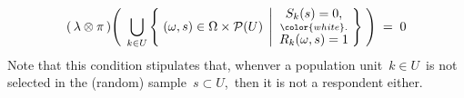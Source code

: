 \begin{itemize}
    \begin{equation*}
    (\,\lambda\otimes\pi\,)\!\left(\;\,
        \underset{k \in U}{\bigcup}\left\{\;
            (\omega,s) \in \Omega\times\mathcal{P}(U)
            \;\left\vert
            \begin{array}{c}
            S_{k}(s) = 0, %
            \\
            \overset{{\color{white}.}}{R_{k}(\omega,s) = 1}
            \end{array}
            \right.
            \!\!\right\}
        \;\right)
    \; = \;
        0
    \end{equation*}
    Note that this condition stipulates that,
    whenver a population unit \,$k \in U$\, is not selected in the (random) sample \,$s \subset U$,\,
    then it is not a respondent either.
\end{itemize}

